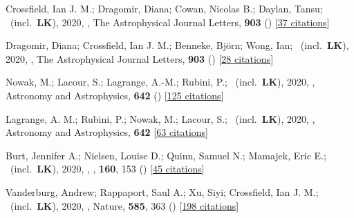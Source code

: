 \item[{\color{numcolor}\scriptsize45}] Crossfield, Ian J. M.; Dragomir, Diana; Cowan, Nicolas B.; Daylan, Tansu; \etal\ (incl.\ \textbf{LK}), 2020, , The Astrophysical Journal Letters, \textbf{903} () [\href{https://ui.adsabs.harvard.edu/abs/2020ApJ...903L...7C}{37 citations}]

\item[{\color{numcolor}\scriptsize44}] Dragomir, Diana; Crossfield, Ian J. M.; Benneke, Bj{\"o}rn; Wong, Ian; \etal\ (incl.\ \textbf{LK}), 2020, , The Astrophysical Journal Letters, \textbf{903} () [\href{https://ui.adsabs.harvard.edu/abs/2020ApJ...903L...6D}{28 citations}]

\item[{\color{numcolor}\scriptsize43}] Nowak, M.; Lacour, S.; Lagrange, A.-M.; Rubini, P.; \etal\ (incl.\ \textbf{LK}), 2020, , Astronomy and Astrophysics, \textbf{642} () [\href{https://ui.adsabs.harvard.edu/abs/2020A&A...642L...2N}{125 citations}]

\item[{\color{numcolor}\scriptsize42}] Lagrange, A. M.; Rubini, P.; Nowak, M.; Lacour, S.; \etal\ (incl.\ \textbf{LK}), 2020, , Astronomy and Astrophysics, \textbf{642} [\href{https://ui.adsabs.harvard.edu/abs/2020A&A...642A..18L}{63 citations}]

\item[{\color{numcolor}\scriptsize41}] Burt, Jennifer A.; Nielsen, Louise D.; Quinn, Samuel N.; Mamajek, Eric E.; \etal\ (incl.\ \textbf{LK}), 2020, , \aj, \textbf{160}, 153 () [\href{https://ui.adsabs.harvard.edu/abs/2020AJ....160..153B}{45 citations}]

\item[{\color{numcolor}\scriptsize40}] Vanderburg, Andrew; Rappaport, Saul A.; Xu, Siyi; Crossfield, Ian J. M.; \etal\ (incl.\ \textbf{LK}), 2020, , Nature, \textbf{585}, 363 () [\href{https://ui.adsabs.harvard.edu/abs/2020Natur.585..363V}{198 citations}]

